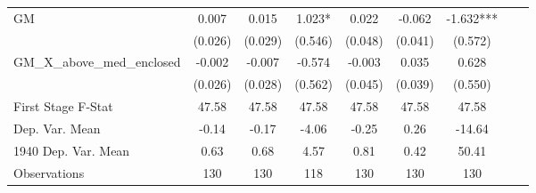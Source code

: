 \begin{tabular}{l*{8}{c}}
\cmidrule(lr){1-7}
GM              &    0.007   &    0.015   &    1.023*  &    0.022   &   -0.062   &   -1.632***\\
                &  (0.026)   &  (0.029)   &  (0.546)   &  (0.048)   &  (0.041)   &  (0.572)   \\
\addlinespace
GM\_X\_above\_med\_enclosed&   -0.002   &   -0.007   &   -0.574   &   -0.003   &    0.035   &    0.628   \\
                &  (0.026)   &  (0.028)   &  (0.562)   &  (0.045)   &  (0.039)   &  (0.550)   \\
\midrule
First Stage F-Stat&    47.58   &    47.58   &    47.58   &    47.58   &    47.58   &    47.58   \\
Dep. Var. Mean  &    -0.14   &    -0.17   &    -4.06   &    -0.25   &     0.26   &   -14.64   \\
1940 Dep. Var. Mean&     0.63   &     0.68   &     4.57   &     0.81   &     0.42   &    50.41   \\
Observations    &      130   &      130   &      118   &      130   &      130   &      130   \\
 \bottomrule \end{tabular}
